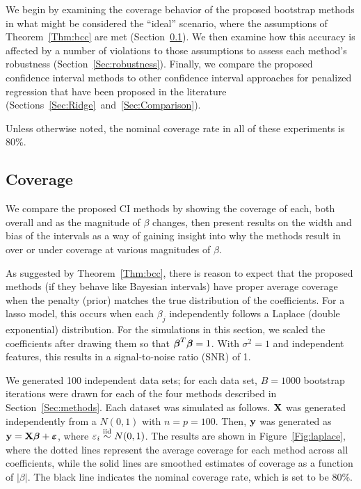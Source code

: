 We begin by examining the coverage behavior of the proposed bootstrap methods in what might be considered the ``ideal'' scenario, where the assumptions of Theorem~\ref{Thm:bcc} are met (Section~\ref{Sec:Coverage}). We then examine how this accuracy is affected by a number of violations to those assumptions to assess each method's robustness (Section~\ref{Sec:robustness}). Finally, we compare the proposed confidence interval methods to other confidence interval approaches for penalized regression that have been proposed in the literature (Sections~\ref{Sec:Ridge}~and~\ref{Sec:Comparison}).  

Unless otherwise noted, the nominal coverage rate in all of these experiments is 80\%.

\subsection{Coverage}\label{Sec:Coverage}

We compare the proposed CI methods by showing the coverage of each, both overall and as the magnitude of $\beta$ changes, then present results on the width and bias of the intervals as a way of gaining insight into why the methods result in over or under coverage at various magnitudes of $\beta$.

As suggested by Theorem~\ref{Thm:bcc}, there is reason to expect that the proposed methods (if they behave like Bayesian intervals) have proper average coverage when the penalty (prior) matches the true distribution of the coefficients. For a lasso model, this occurs when each $\beta_j$ independently follows a Laplace (double exponential) distribution. For the simulations in this section, we scaled the coefficients after drawing them so that $\boldsymbol{\beta}^T\boldsymbol{\beta} = 1$. With $\sigma^2=1$ and independent features, this results in a signal-to-noise ratio (SNR) of 1.

We generated 100 independent data sets; for each data set, $B = 1000$ bootstrap iterations were drawn for each of the four methods described in Section~\ref{Sec:methods}. Each dataset was simulated as follows. $\mathbf{X}$ was generated independently from a $N(0, 1)$ with $n = p = 100$. Then, $\mathbf{y}$ was generated as $\mathbf{y} = \mathbf{X}\boldsymbol{\beta} + \boldsymbol{\varepsilon}$, where $\varepsilon_i \overset{\text{iid}}{\sim} N(0, 1)$. The results are shown in Figure~\ref{Fig:laplace}, where the dotted lines represent the average coverage for each method across all coefficients, while the solid lines are smoothed estimates of coverage as a function of $|\beta|$. The black line indicates the nominal coverage rate, which is set to be 80\%.

